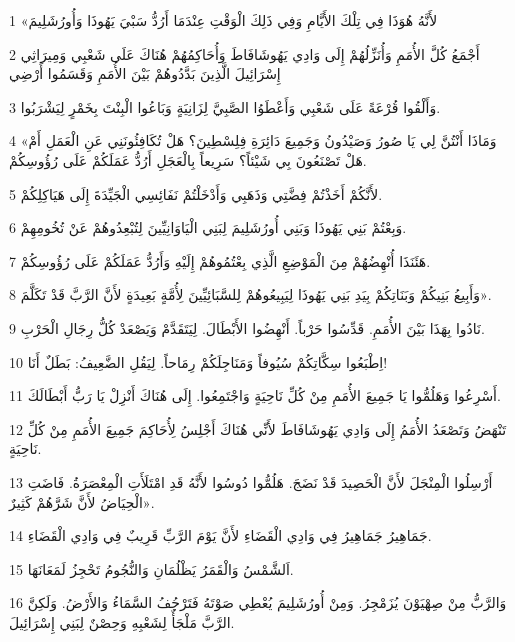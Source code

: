 \par 1 «لأَنَّهُ هُوَذَا فِي تِلْكَ الأَيَّامِ وَفِي ذَلِكَ الْوَقْتِ عِنْدَمَا أَرُدُّ سَبْيَ يَهُوذَا وَأُورُشَلِيمَ
\par 2 أَجْمَعُ كُلَّ الأُمَمِ وَأُنَزِّلُهُمْ إِلَى وَادِي يَهُوشَافَاطَ وَأُحَاكِمُهُمْ هُنَاكَ عَلَى شَعْبِي وَمِيرَاثِي إِسْرَائِيلَ الَّذِينَ بَدَّدُوهُمْ بَيْنَ الأُمَمِ وَقَسَمُوا أَرْضِي
\par 3 وَأَلْقُوا قُرْعَةً عَلَى شَعْبِي وَأَعْطَوُا الصَّبِيَّ لِزَانِيَةٍ وَبَاعُوا الْبِنْتَ بِخَمْرٍ لِيَشْرَبُوا.
\par 4 «وَمَاذَا أَنْتُنَّ لِي يَا صُورُ وَصَيْدُونُ وَجَمِيعَ دَائِرَةِ فِلِسْطِينَ؟ هَلْ تُكَافِئُونَنِي عَنِ الْعَمَلِ أَمْ هَلْ تَصْنَعُونَ بِي شَيْئاً؟ سَرِيعاً بِالْعَجَلِ أَرُدُّ عَمَلَكُمْ عَلَى رُؤُوسِكُمْ.
\par 5 لأَنَّكُمْ أَخَذْتُمْ فِضَّتِي وَذَهَبِي وَأَدْخَلْتُمْ نَفَائِسِي الْجَيِّدَةَ إِلَى هَيَاكِلِكُمْ.
\par 6 وَبِعْتُمْ بَنِي يَهُوذَا وَبَنِي أُورُشَلِيمَ لِبَنِي الْيَاوَانِيِّينَ لِتُبْعِدُوهُمْ عَنْ تُخُومِهِمْ.
\par 7 هَئَنَذَا أُنْهِضُهُمْ مِنَ الْمَوْضِعِ الَّذِي بِعْتُمُوهُمْ إِلَيْهِ وَأَرُدُّ عَمَلَكُمْ عَلَى رُؤُوسِكُمْ.
\par 8 وَأَبِيعُ بَنِيكُمْ وَبَنَاتِكُمْ بِيَدِ بَنِي يَهُوذَا لِيَبِيعُوهُمْ لِلسَّبَائِيِّينَ لِأُمَّةٍ بَعِيدَةٍ لأَنَّ الرَّبَّ قَدْ تَكَلَّمَ».
\par 9 نَادُوا بِهَذَا بَيْنَ الأُمَمِ. قَدِّسُوا حَرْباً. أَنْهِضُوا الأَبْطَالَ. لِيَتَقَدَّمْ وَيَصْعَدْ كُلُّ رِجَالِ الْحَرْبِ.
\par 10 اِطْبَعُوا سِكَّاتِكُمْ سُيُوفاً وَمَنَاجِلَكُمْ رِمَاحاً. لِيَقُلِ الضَّعِيفُ: بَطَلٌ أَنَا!
\par 11 أَسْرِعُوا وَهَلُمُّوا يَا جَمِيعَ الأُمَمِ مِنْ كُلِّ نَاحِيَةٍ وَاجْتَمِعُوا. إِلَى هُنَاكَ أَنْزِلْ يَا رَبُّ أَبْطَالَكَ.
\par 12 تَنْهَضُ وَتَصْعَدُ الأُمَمُ إِلَى وَادِي يَهُوشَافَاطَ لأَنِّي هُنَاكَ أَجْلِسُ لِأُحَاكِمَ جَمِيعَ الأُمَمِ مِنْ كُلِّ نَاحِيَةٍ.
\par 13 أَرْسِلُوا الْمِنْجَلَ لأَنَّ الْحَصِيدَ قَدْ نَضَجَ. هَلُمُّوا دُوسُوا لأَنَّهُ قَدِ امْتَلَأَتِ الْمِعْصَرَةُ. فَاضَتِ الْحِيَاضُ لأَنَّ شَرَّهُمْ كَثِيرٌ».
\par 14 جَمَاهِيرُ جَمَاهِيرُ فِي وَادِي الْقَضَاءِ لأَنَّ يَوْمَ الرَّبِّ قَرِيبٌ فِي وَادِي الْقَضَاءِ.
\par 15 اَلشَّمْسُ وَالْقَمَرُ يَظْلُمَانِ وَالنُّجُومُ تَحْجِزُ لَمَعَانَهَا.
\par 16 وَالرَّبُّ مِنْ صِهْيَوْنَ يُزَمْجِرُ. وَمِنْ أُورُشَلِيمَ يُعْطِي صَوْتَهُ فَتَرْجُفُ السَّمَاءُ وَالأَرْضُ. وَلَكِنَّ الرَّبَّ مَلْجَأٌ لِشَعْبِهِ وَحِصْنٌ لِبَنِي إِسْرَائِيلَ.
